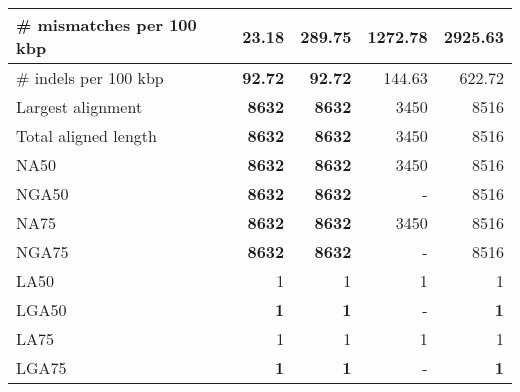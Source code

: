 \documentclass[12pt,a4paper]{article}
\begin{document}
\begin{table}[ht]
\begin{center}
\begin{tabular}{|l*{4}{|r}|}
\# mismatches per 100 kbp & {\bf 23.18} & 289.75 & 1272.78 & 2925.63 \\ \hline
\# indels per 100 kbp & {\bf 92.72} & {\bf 92.72} & 144.63 & 622.72 \\ \hline
Largest alignment & {\bf 8632} & {\bf 8632} & 3450 & 8516 \\ \hline
Total aligned length & {\bf 8632} & {\bf 8632} & 3450 & 8516 \\ \hline
NA50 & {\bf 8632} & {\bf 8632} & 3450 & 8516 \\ \hline
NGA50 & {\bf 8632} & {\bf 8632} & - & 8516 \\ \hline
NA75 & {\bf 8632} & {\bf 8632} & 3450 & 8516 \\ \hline
NGA75 & {\bf 8632} & {\bf 8632} & - & 8516 \\ \hline
LA50 & 1 & 1 & 1 & 1 \\ \hline
LGA50 & {\bf 1} & {\bf 1} & - & {\bf 1} \\ \hline
LA75 & 1 & 1 & 1 & 1 \\ \hline
LGA75 & {\bf 1} & {\bf 1} & - & {\bf 1} \\ \hline
\end{tabular}
\end{center}
\end{table}
\end{document}
